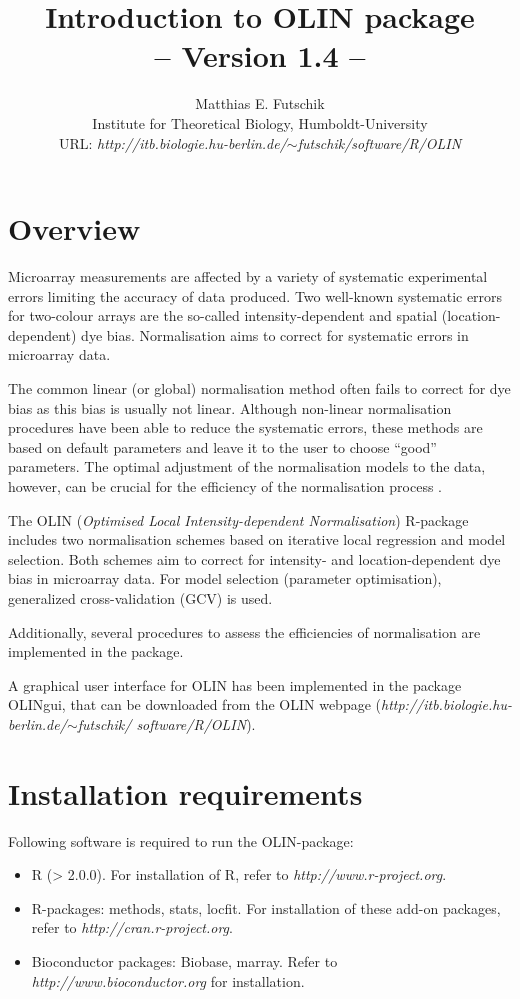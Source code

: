 \documentclass[a4paper,11pt]{article}
\title{Introduction to OLIN package \\ \large{-- Version 1.4 --}}
\author{Matthias E. Futschik\\ Institute for Theoretical Biology,  Humboldt-University\\ URL: \textit{http://itb.biologie.hu-berlin.de/$\sim$futschik/software/R/OLIN}}
\begin{document}
\maketitle
\tableofcontents

\section{Overview}
Microarray measurements are affected by a variety of systematic experimental errors 
limiting the accuracy of data produced. 
Two well-known systematic errors for two-colour arrays are    
the so-called intensity-dependent and spatial (location-dependent) dye bias. 
Normalisation aims to correct for systematic errors in microarray data.

The common linear (or global) normalisation method  often fails to correct for dye  bias 
as this bias is usually not linear.  Although non-linear normalisation procedures have been 
able to reduce the systematic errors,
these methods are based on default parameters and leave it to the user to choose ``good'' 
parameters. The optimal adjustment of the normalisation models to the data, however,
can be crucial for the efficiency of the normalisation process \cite{toni}. 

The OLIN (\textit{Optimised Local Intensity-dependent Normalisation})  
R-package includes two normalisation schemes based on iterative  local regression
and model selection. Both  schemes aim to correct for intensity- and location-dependent  dye bias in  microarray data. For model selection (parameter optimisation), generalized cross-validation (GCV) is used. 

Additionally, several procedures to assess the efficiencies of normalisation are implemented
in the package. 

A graphical user interface for OLIN has been implemented in the package OLINgui, that
can be downloaded from the OLIN webpage (\textit{http://itb.biologie.hu-berlin.de/$\sim$futschik/
software/R/OLIN}).

\section{Installation requirements}
Following software is required to run the OLIN-package:
\begin{itemize} 
\item  R (> 2.0.0). For installation of R, refer to \textit{http://www.r-project.org}.
\item  R-packages: methods, stats, locfit. For installation of these add-on packages, refer to \textit{http://cran.r-project.org}.
\item Bioconductor packages: Biobase, marray. Refer to \textit{http://www.bioconductor.org} for installation. 
\end{itemize}
\end{document}

